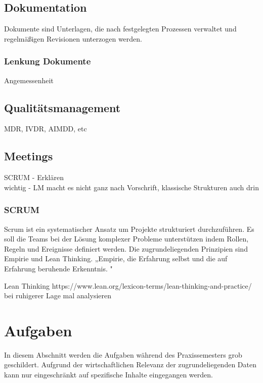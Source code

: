 \documentclass[a4paper, 12pt]{article}
\begin{document}
\subsection{Dokumentation}\label{Dokumentation}
Dokumente sind Unterlagen, die nach festgelegten Prozessen verwaltet und regelmäßigen Revisionen unterzogen werden. \\
\subsubsection{Lenkung Dokumente}\label{lenkung_dokumente}
Angemessenheit

\subsection{Qualitätsmanagement}\label{Qualitätsmanagement}
MDR, IVDR, AIMDD, etc


\subsection{Meetings}\label{Meetings}
SCRUM - Erklären
\\wichtig - LM macht es nicht ganz nach Vorschrift, klassische Strukturen auch drin

\subsubsection{SCRUM}\label{SCRUM}
Scrum ist ein systematischer Ansatz um Projekte strukturiert durchzuführen. Es soll die Teams bei der Lösung komplexer Probleme unterstützen indem Rollen, Regeln und Ereignisse definiert werden. Die zugrundeliegenden Prinzipien sind Empirie und Lean Thinking. 
„Empirie, die Erfahrung selbst und die auf Erfahrung beruhende Erkenntnis.  
 \cite{dorsch_empirie}"
 
Lean Thinking https://www.lean.org/lexicon-terms/lean-thinking-and-practice/
bei ruhigerer Lage mal analysieren %
 

\cite{scrum2020}


\newpage
\section{Aufgaben}\label{Aufgaben}
In diesem Abschnitt werden die Aufgaben während des Praxissemesters grob geschildert. Aufgrund der wirtschaftlichen Relevanz der zugrundeliegenden Daten kann nur eingeschränkt auf spezifische Inhalte eingegangen werden.
\end{document}
